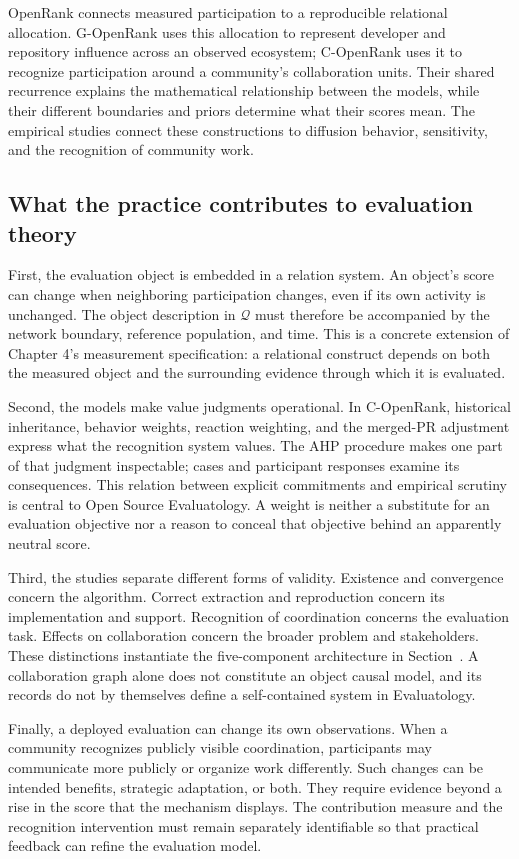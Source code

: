 OpenRank connects measured participation to a reproducible relational allocation. G-OpenRank uses this allocation to represent developer and repository influence across an observed ecosystem; C-OpenRank uses it to recognize participation around a community's collaboration units. Their shared recurrence explains the mathematical relationship between the models, while their different boundaries and priors determine what their scores mean. The empirical studies connect these constructions to diffusion behavior, sensitivity, and the recognition of community work.

\subsection{What the practice contributes to evaluation theory}
First, the evaluation object is embedded in a relation system. An object's score can change when neighboring participation changes, even if its own activity is unchanged. The object description in \(\mathcal Q\) must therefore be accompanied by the network boundary, reference population, and time. This is a concrete extension of Chapter 4's measurement specification: a relational construct depends on both the measured object and the surrounding evidence through which it is evaluated.

Second, the models make value judgments operational. In C-OpenRank, historical inheritance, behavior weights, reaction weighting, and the merged-PR adjustment express what the recognition system values. The AHP procedure makes one part of that judgment inspectable; cases and participant responses examine its consequences. This relation between explicit commitments and empirical scrutiny is central to Open Source Evaluatology. A weight is neither a substitute for an evaluation objective nor a reason to conceal that objective behind an apparently neutral score.

Third, the studies separate different forms of validity. Existence and convergence concern the algorithm. Correct extraction and reproduction concern its implementation and support. Recognition of coordination concerns the evaluation task. Effects on collaboration concern the broader problem and stakeholders. These distinctions instantiate the five-component architecture in Section~. A collaboration graph alone does not constitute an object causal model, and its records do not by themselves define a self-contained system in Evaluatology.

Finally, a deployed evaluation can change its own observations. When a community recognizes publicly visible coordination, participants may communicate more publicly or organize work differently. Such changes can be intended benefits, strategic adaptation, or both. They require evidence beyond a rise in the score that the mechanism displays. The contribution measure and the recognition intervention must remain separately identifiable so that practical feedback can refine the evaluation model.

